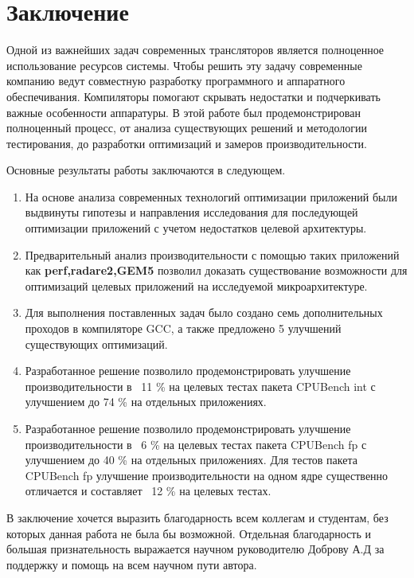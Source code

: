 \chapter*{Заключение}                       %

Одной из важнейших задач современных трансляторов является полноценное использование ресурсов системы. Чтобы решить эту задачу современные компанию ведут совместную разработку программного и аппаратного обеспечивания. Компиляторы помогают скрывать недостатки и подчеркивать важные особенности аппаратуры. В этой работе был продемонстрирован полноценный процесс, от анализа существующих решений и методологии тестирования, до разработки оптимизаций и замеров производительности. 

Основные результаты работы заключаются в следующем.
\begin{enumerate}
	\item На основе анализа современных технологий оптимизации приложений были выдвинуты гипотезы и направления исследования для последующей оптимизации приложений с учетом недостатков целевой архитектуры.
	\item Предварительный анализ производительности с помощью таких приложений как \textbf{perf,radare2,GEM5} позволил доказать существование возможности  для оптимизаций целевых приложений на исследуемой микроархитектуре. 
	\item Для выполнения поставленных задач было создано семь дополнительных проходов в компиляторе GCC, а также предложено 5 улучшений существующих оптимизаций.
	\item Разработанное решение позволило продемонстрировать улучшение производительности в ~11 \% на целевых тестах пакета CPUBench int  с улучшением до 74 \% на отдельных приложениях. 
	\item Разработанное решение позволило продемонстрировать улучшение производительности в ~6 \% на целевых тестах пакета CPUBench fp  с улучшением до 40 \% на отдельных приложениях. Для тестов пакета CPUBench fp улучшение производительности на  одном ядре существенно отличается и составляет ~12 \% на целевых тестах.
\end{enumerate}

В заключение хочется выразить благодарность всем коллегам и студентам, без которых данная работа не была бы возможной. Отдельная благодарность и большая признательность выражается научном руководителю Доброву А.Д за поддержку и помощь на всем научном пути автора.
